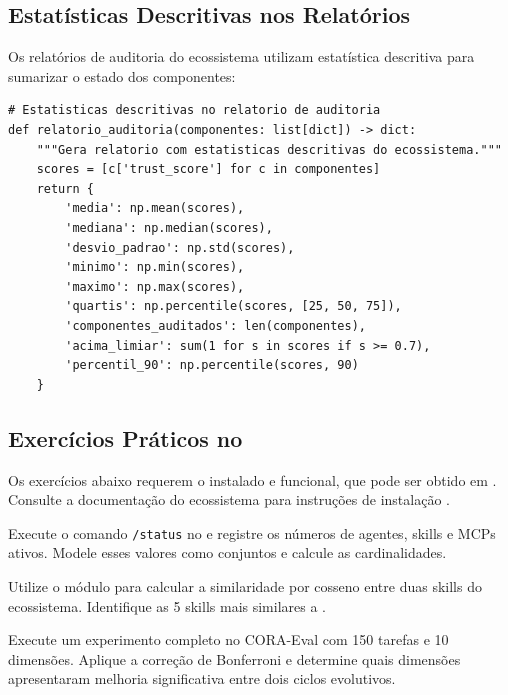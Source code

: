 \subsection{Estatísticas Descritivas nos Relatórios}

Os relatórios de auditoria do ecossistema utilizam estatística descritiva
para sumarizar o estado dos componentes:

\begin{lstlisting}[style=pythonstyle]
# Estatisticas descritivas no relatorio de auditoria
def relatorio_auditoria(componentes: list[dict]) -> dict:
    """Gera relatorio com estatisticas descritivas do ecossistema."""
    scores = [c['trust_score'] for c in componentes]
    return {
        'media': np.mean(scores),
        'mediana': np.median(scores),
        'desvio_padrao': np.std(scores),
        'minimo': np.min(scores),
        'maximo': np.max(scores),
        'quartis': np.percentile(scores, [25, 50, 75]),
        'componentes_auditados': len(componentes),
        'acima_limiar': sum(1 for s in scores if s >= 0.7),
        'percentil_90': np.percentile(scores, 90)
    }
\end{lstlisting}

\subsection{Exercícios Práticos no \opencodeeco{}}

Os exercícios abaixo requerem o \opencodeeco{} instalado e funcional, que pode ser obtido em \cite{opencode2026ecosystem}.
Consulte a documentação do ecossistema para instruções de instalação
\cite{opencode2026ecosystem}.

\begin{exercicio}
    Execute o comando \lstinline{/status} no \opencodeeco{} e registre os
    números de agentes, skills e MCPs ativos. Modele esses valores como
    conjuntos e calcule as cardinalidades.
\end{exercicio}

\begin{exercicio}
    Utilize o módulo  para calcular a
    similaridade por cosseno entre duas skills do ecossistema. Identifique
    as 5 skills mais similares a .
\end{exercicio}

\begin{exercicio}
    Execute um experimento completo no CORA-Eval com 150 tarefas e 10
    dimensões. Aplique a correção de Bonferroni e determine quais dimensões
    apresentaram melhoria significativa entre dois ciclos evolutivos.
\end{exercicio}

